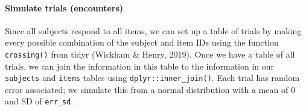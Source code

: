 \documentclass[man,floatsintext]{apa6}
\newenvironment{Shaded}{\begin{snugshade}}{\end{snugshade}}
\newcommand{\CommentTok}[1]{\textcolor[rgb]{0.56,0.35,0.01}{\textit{#1}}}
\newcommand{\DataTypeTok}[1]{\textcolor[rgb]{0.13,0.29,0.53}{#1}}
\newcommand{\DecValTok}[1]{\textcolor[rgb]{0.00,0.00,0.81}{#1}}
\newcommand{\KeywordTok}[1]{\textcolor[rgb]{0.13,0.29,0.53}{\textbf{#1}}}
\newcommand{\NormalTok}[1]{#1}
\newcommand{\OperatorTok}[1]{\textcolor[rgb]{0.81,0.36,0.00}{\textbf{#1}}}
\newcommand{\StringTok}[1]{\textcolor[rgb]{0.31,0.60,0.02}{#1}}
\let\oldparagraph\paragraph
\renewcommand{\paragraph}[1]{\oldparagraph{#1}\mbox{}}
\begin{document}
\hypertarget{simulate-trials-encounters}{%
\paragraph{Simulate trials (encounters)}\label{simulate-trials-encounters}}

Since all subjects respond to all items, we can set up a table of trials by making every possible combination of the subject and item IDs using the function \texttt{crossing()} from tidyr (Wickham \& Henry, 2019). Once we have a table of all trials, we can join the information in this table to the information in our \texttt{subjects} and \texttt{items} tables using \texttt{dplyr::inner\_join()}. Each trial has random error associated; we simulate this from a normal distribution with a mean of 0 and SD of \texttt{err\_sd}.

\begin{Shaded}
\end{Shaded}
\end{document}
